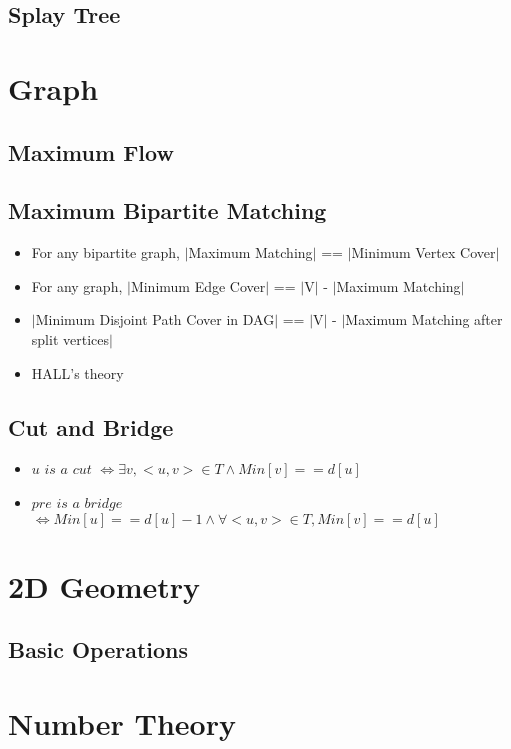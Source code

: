 \documentclass[twoside]{article}
\begin{document}
		\subsection{Splay Tree}
			
	\newpage
	\section{Graph}
		\subsection{Maximum Flow}
			
		\newpage
		\subsection{Maximum Bipartite Matching}
			
			\begin{itemize}
				\item For any bipartite graph, $|$Maximum Matching$|$ == $|$Minimum Vertex Cover$|$
				\item For any graph, $|$Minimum Edge Cover$|$ == $|$V$|$ - $|$Maximum Matching$|$
				\item $|$Minimum Disjoint Path Cover in DAG$|$ == $|$V$|$ - $|$Maximum Matching after split vertices$|$
				\item HALL's theory
			\end{itemize}
		\newpage
		\subsection{Cut and Bridge}
			
			\begin{itemize}
				\item $u$ $is$ $a$ $cut$ $\Leftrightarrow \exists v, <u, v> \in T \wedge Min[v] == d[u]$
				\item $pre$ $is$ $a$ $bridge$ $\Leftrightarrow Min[u] == d[u] - 1 \wedge \forall <u, v> \in T, Min[v] == d[u]$
			\end{itemize}
			
	\newpage
	\section{2D Geometry}
		\subsection{Basic Operations}
			
	\newpage
	\section{Number Theory}
\end{document}
